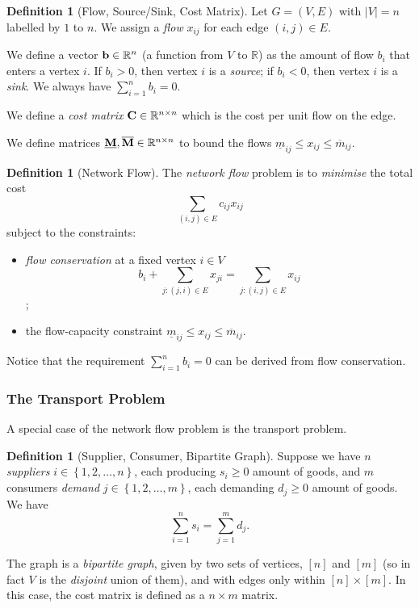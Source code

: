 \documentclass[11pt]{article}
\theoremstyle{definition}
\newtheorem{definition}[theorem]{Definition}
\theoremstyle{remark}
\newcommand{\pqty}[1]{\left(#1\right)}
\newcommand{\bqty}[1]{\left[#1\right]}
\newcommand{\Bqty}[1]{\left\{#1\right\}}
\newcommand{\abs}[1]{\left|#1\right|}
\newcommand{\RR}{\mathbb{R}}
\begin{document}
\begin{definition}[Flow, Source/Sink, Cost Matrix]\label{optim-unit-0066}
    Let \(G = \pqty{V, E}\) with \(\abs{V} = n\) labelled by \(1\) to \(n\). We assign a \emph{flow} \(x_{ij}\) for each edge \(\pqty{i, j} \in E\).

    We define a vector \(\vb{b} \in \RR^n\) (a function from \(V\) to \(\RR\)) as the amount of flow \(b_i\) that enters a vertex \(i\). If \(b_i > 0\), then vertex \(i\) is a \emph{source}; if \(b_i < 0\), then vertex \(i\) is a \emph{sink}. We always have \(\sum_{i = 1}^{n} b_i = 0\).

    We define a \emph{cost matrix} \(\vb{C} \in \RR^{n \times n}\) which is the cost per unit flow on the edge.

    We define matrices \(\underline{\vb{M}}, \overline{\vb{M}} \in \RR^{n \times n}\) to bound the flows \(\underline{m}_{ij} \leq x_{ij} \leq \overline{m}_{ij}\).
\end{definition}

\begin{definition}[Network Flow]\label{optim-unit-0067}
    The \emph{network flow} problem is to \emph{minimise} the total cost
    \[
        \sum_{\pqty{i, j} \in E} c_{ij} x_{ij}
    \]
    subject to the constraints:
    \begin{itemize}
        \item \emph{flow conservation} at a fixed vertex \(i \in V\)
        \[
            b_i + \sum_{j: \pqty{j, i} \in E} x_{ji} = \sum_{j: \pqty{i, j} \in E} x_{ij}
        \];
        \item the flow-capacity constraint \(\underline{m}_{ij} \leq x_{ij} \leq \overline{m}_{ij}\).
    \end{itemize}
\end{definition}

Notice that the requirement \(\sum_{i = 1}^{n} b_i = 0\) can be derived from flow conservation.

\subsubsection{The Transport Problem}

A special case of the network flow problem is the transport problem.

\begin{definition}[Supplier, Consumer, Bipartite Graph]\label{optim-unit-0068}
    Suppose we have \(n\) \emph{suppliers} \(i \in \Bqty{1, 2, \ldots, n}\), each producing \(s_i\ge0\) amount of goods, and \(m\) consumers \emph{demand} \(j \in \Bqty{1, 2, \ldots, m}\), each demanding \(d_j\ge0\) amount of goods. We have
    \[
        \sum_{i = 1}^{n} s_i = \sum_{j = 1}^{m} d_j.
    \]

    The graph is a \emph{bipartite graph}, given by two sets of vertices, \(\bqty{n}\) and \(\bqty{m}\) (so in fact \(V\) is the \emph{disjoint} union of them), and with edges only within \(\bqty{n} \times \bqty{m}\). In this case, the cost matrix is defined as a \(n \times m\) matrix.
\end{definition}
\end{document}
